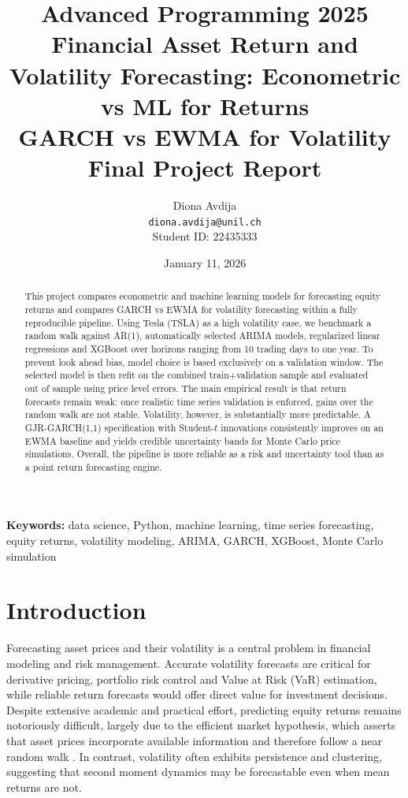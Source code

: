 \documentclass[11pt,a4paper]{article}
\title{%
    \Large \textbf{Advanced Programming 2025} \\
    \vspace{0.5cm}
    \LARGE \textbf{Financial Asset Return and Volatility Forecasting: Econometric vs ML for Returns \\ GARCH vs EWMA for Volatility} \\
    \vspace{0.3cm}
    \large Final Project Report
}
\author{%
    Diona Avdija \\
    \texttt{diona.avdija@unil.ch} \\
    Student ID: 22435333
}
\date{January 11, 2026}
\begin{document}
\maketitle
\thispagestyle{empty}

\begin{abstract}
\noindent
This project compares econometric and machine learning models for forecasting equity returns and compares GARCH vs EWMA for volatility forecasting within a fully reproducible pipeline. Using Tesla (TSLA) as a high volatility case, we benchmark a random walk against AR(1), automatically selected ARIMA models, regularized linear regressions and XGBoost over horizons ranging from 10 trading days to one year. To prevent look ahead bias, model choice is based exclusively on a validation window. The selected model is then refit on the combined train+validation sample and evaluated out of sample using price level errors. The main empirical result is that return forecasts remain weak: once realistic time series validation is enforced, gains over the random walk are not stable. Volatility, however, is substantially more predictable. A GJR-GARCH(1,1) specification with Student-$t$ innovations consistently improves on an EWMA baseline and yields credible uncertainty bands for Monte Carlo price simulations. Overall, the pipeline is more reliable as a risk and uncertainty tool than as a point return forecasting engine.
\end{abstract}

\vspace{0.5cm}
\noindent\textbf{Keywords:} data science, Python, machine learning, time series forecasting, equity returns, volatility modeling, ARIMA, GARCH, XGBoost, Monte Carlo simulation

\newpage
\tableofcontents
\newpage


\section{Introduction}
\label{sec:introduction}
\begingroup
\setlength{\parskip}{0.35\baselineskip}
\setlength{\parindent}{1.25em}

\hspace*{\parindent}Forecasting asset prices and their volatility is a central problem in financial modeling and risk management. Accurate volatility forecasts are critical for derivative pricing, portfolio risk control and Value at Risk (VaR) estimation, while reliable return forecasts would offer direct value for investment decisions. Despite extensive academic and practical effort, predicting equity returns remains notoriously difficult, largely due to the efficient market hypothesis, which asserts that asset prices incorporate available information and therefore follow a near random walk \parencite{Fama1970}. In contrast, volatility often exhibits persistence and clustering, suggesting that second moment dynamics may be forecastable even when mean returns are not.
\end{document}
